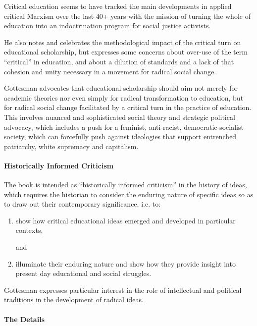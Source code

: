 \documentclass[10pt,titlepage]{book}
\begin{document}
Critical education seems to have tracked the main developments in applied critical Marxism over the last 40+ years with the mission of turning the whole of education into an indoctrination program for social justice activists.

He also notes and celebrates the methodological impact of the critical turn on educational scholarship, but expresses some concerns about over-use of the term ``critical'' in education, and about a dilution of standards and a lack of that cohesion and unity necessary in a movement for radical social change.

Gottesman advocates that educational scholarship should aim not merely for academic theories nor even simply for radical transformation to education, but for radical social change facilitated by a critical turn in the practice of education.
This involves nuanced and sophisticated social theory and strategic political advocacy,  which includes a push for a feminist, anti-racist, democratic-socialist society, which can forcefully push against ideologies that support entrenched patriarchy, white supremacy and capitalism.

\paragraph{Historically Informed Criticism}

The book is intended as ``historically informed criticism'' in the history of ideas, which requires the historian to consider the enduring nature of specific ideas so as to draw out their contemporary significance, i.e. to:

\begin{enumerate}
\item show how critical educational ideas emerged and developed in particular contexts,

  and
  
\item illuminate their enduring nature and show how they provide insight into present day educational and social struggles.
  
\end{enumerate}

Gottesman expresses particular interest in the role of intellectual and political traditions in the development of radical ideas.

\paragraph{The Details}
\end{document}
